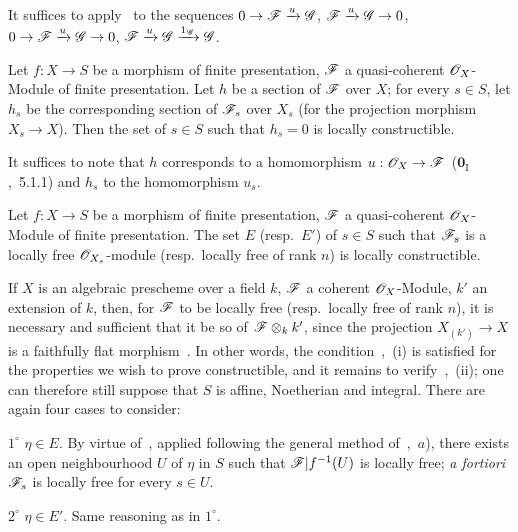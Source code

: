It suffices to apply~ to the sequences $0\to\mathscr{F}\xrightarrow{u}\mathscr{G}$, $\mathscr{F}\xrightarrow{u}\mathscr{G}\to 0$, $0\to\mathscr{F}\xrightarrow{u}\mathscr{G}\to 0$, $\mathscr{F}\xrightarrow{u}\mathscr{G}\xrightarrow{1_{\mathscr{G}}}\mathscr{G}$.

\begin{corollary}[9.4.6]
\label{IV.9.4.6}
Let $f:X\to S$ be a morphism of finite presentation, $\mathscr{F}$ a quasi-coherent $\mathscr{O}_X$-Module of finite presentation.
Let $h$ be a section of $\mathscr{F}$ over $X$; for every $s\in S$, let $h_s$ be the corresponding section of $\mathscr{F}_s$ over $X_s$ \textnormal{(}for the projection morphism $X_s\to X$\textnormal{)}.
Then the set of $s\in S$ such that $h_s=0$ is locally constructible.
\end{corollary}

It suffices to note that $h$ corresponds to a homomorphism $u:\mathscr{O}_X\to\mathscr{F}$~($\mathbf{0}_{\mathrm{I}}$,~5.1.1) and $h_s$ to the homomorphism $u_s$.

\begin{proposition}[9.4.7]
\label{IV.9.4.7}
Let $f:X\to S$ be a morphism of finite presentation, $\mathscr{F}$ a quasi-coherent $\mathscr{O}_X$-Module of finite presentation.
The set $E$ \textnormal{(resp.}\ $E'$\textnormal{)} of $s\in S$ such that $\mathscr{F}_s$ is a locally free $\mathscr{O}_{X_s}$-module \textnormal{(resp.}\ locally free of rank $n$\textnormal{)} is locally constructible.
\end{proposition}

If $X$ is an algebraic prescheme over a field $k$, $\mathscr{F}$ a coherent $\mathscr{O}_X$-Module, $k'$ an extension of $k$, then, for $\mathscr{F}$ to be locally free (resp.\ locally free of rank $n$), it is necessary and sufficient that it be so of $\mathscr{F}\otimes_k k'$, since the projection $X_{(k')}\to X$ is a faithfully flat morphism~.
In other words, the condition~,~(i) is satisfied for the properties we wish to prove constructible, and it remains to verify~,~(ii); one can therefore still suppose that $S$ is affine, Noetherian and integral.
There are again four cases to consider:

$1^\circ$ $\eta\in E$.
By virtue of~, applied following the general method of~,~$a$), there exists an open neighbourhood $U$ of $\eta$ in $S$ such that $\mathscr{F}|f^{-1}(U)$ is locally free; \emph{a fortiori} $\mathscr{F}_s$ is locally free for every $s\in U$.

$2^\circ$ $\eta\in E'$.
Same reasoning as in $1^\circ$.

